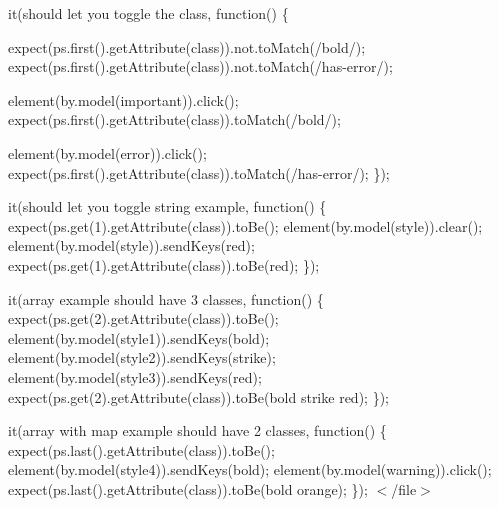 it(\textquotesingle{}should let you toggle the class\textquotesingle{}, function() \{

expect(ps.\+first().get\+Attribute(\textquotesingle{}class\textquotesingle{})).not.\+to\+Match(/bold/); expect(ps.\+first().get\+Attribute(\textquotesingle{}class\textquotesingle{})).not.\+to\+Match(/has-\/error/);

element(by.\+model(\textquotesingle{}important\textquotesingle{})).click(); expect(ps.\+first().get\+Attribute(\textquotesingle{}class\textquotesingle{})).to\+Match(/bold/);

element(by.\+model(\textquotesingle{}error\textquotesingle{})).click(); expect(ps.\+first().get\+Attribute(\textquotesingle{}class\textquotesingle{})).to\+Match(/has-\/error/); \});

it(\textquotesingle{}should let you toggle string example\textquotesingle{}, function() \{ expect(ps.\+get(1).get\+Attribute(\textquotesingle{}class\textquotesingle{})).to\+Be(\textquotesingle{}\textquotesingle{}); element(by.\+model(\textquotesingle{}style\textquotesingle{})).clear(); element(by.\+model(\textquotesingle{}style\textquotesingle{})).send\+Keys(\textquotesingle{}red\textquotesingle{}); expect(ps.\+get(1).get\+Attribute(\textquotesingle{}class\textquotesingle{})).to\+Be(\textquotesingle{}red\textquotesingle{}); \});

it(\textquotesingle{}array example should have 3 classes\textquotesingle{}, function() \{ expect(ps.\+get(2).get\+Attribute(\textquotesingle{}class\textquotesingle{})).to\+Be(\textquotesingle{}\textquotesingle{}); element(by.\+model(\textquotesingle{}style1\textquotesingle{})).send\+Keys(\textquotesingle{}bold\textquotesingle{}); element(by.\+model(\textquotesingle{}style2\textquotesingle{})).send\+Keys(\textquotesingle{}strike\textquotesingle{}); element(by.\+model(\textquotesingle{}style3\textquotesingle{})).send\+Keys(\textquotesingle{}red\textquotesingle{}); expect(ps.\+get(2).get\+Attribute(\textquotesingle{}class\textquotesingle{})).to\+Be(\textquotesingle{}bold strike red\textquotesingle{}); \});

it(\textquotesingle{}array with map example should have 2 classes\textquotesingle{}, function() \{ expect(ps.\+last().get\+Attribute(\textquotesingle{}class\textquotesingle{})).to\+Be(\textquotesingle{}\textquotesingle{}); element(by.\+model(\textquotesingle{}style4\textquotesingle{})).send\+Keys(\textquotesingle{}bold\textquotesingle{}); element(by.\+model(\textquotesingle{}warning\textquotesingle{})).click(); expect(ps.\+last().get\+Attribute(\textquotesingle{}class\textquotesingle{})).to\+Be(\textquotesingle{}bold orange\textquotesingle{}); \}); $<$/file$>$ 

